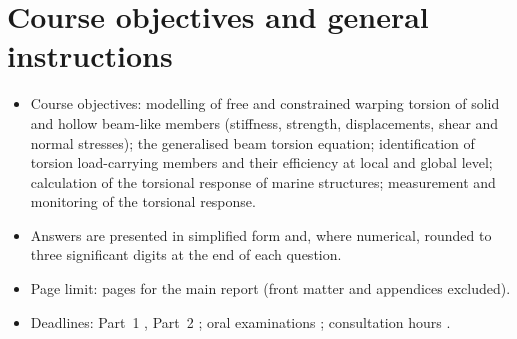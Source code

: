 \section{Course objectives and general instructions}
\label{sec:instructions}


\begin{itemize}
  \item Course objectives: modelling of free and constrained warping torsion of
        solid and hollow beam-like members (stiffness, strength, displacements,
        shear and normal stresses); the generalised beam torsion equation;
        identification of torsion load-carrying members and their efficiency at
        local and global level; calculation of the torsional response of marine
        structures; measurement and monitoring of the torsional response.
  \item Answers are presented in simplified form and, where numerical, rounded
        to three significant digits at the end of each question.
  \item Page limit:  pages for the main report (front matter and
        appendices excluded).
  \item Deadlines: Part~1 , Part~2 ;
        oral examinations ; consultation hours .
\end{itemize}
